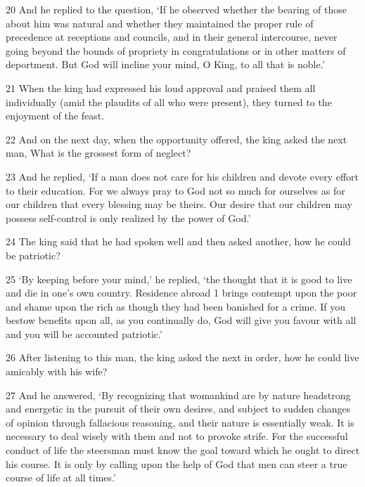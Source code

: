 \par 20 And he replied to the question, ‘If he observed whether the bearing of those about him was natural and whether they maintained the proper rule of precedence at receptions and councils, and in their general intercourse, never going beyond the bounds of propriety in congratulations or in other matters of deportment. But God will incline your mind, O King, to all that is noble.’

\par 21 When the king had expressed his loud approval and praised them all individually (amid the plaudits of all who were present), they turned to the enjoyment of the feast.

\par 22 And on the next day, when the opportunity offered, the king asked the next man, What is the grossest form of neglect?

\par 23 And he replied, ‘If a man does not care for his children and devote every effort to their education. For we always pray to God not so much for ourselves as for our children that every blessing may be theirs. Our desire that our children may possess self-control is only realized by the power of God.’

\par 24 The king said that he had spoken well and then asked another, how he could be patriotic?

\par 25 ‘By keeping before your mind,’ he replied, ‘the thought that it is good to live and die in one's own country. Residence abroad 1 brings contempt upon the poor and shame upon the rich as though they had been banished for a crime. If you bestow benefits upon all, as you continually do, God will give you favour with all and you will be accounted patriotic.’

\par 26 After listening to this man, the king asked the next in order, how he could live amicably with his wife?

\par 27 And he answered, ‘By recognizing that womankind are by nature headstrong and energetic in the pursuit of their own desires, and subject to sudden changes of opinion through fallacious reasoning, and their nature is essentially weak. It is necessary to deal wisely with them and not to provoke strife. For the successful conduct of life the steersman must know the goal toward which he ought to direct his course. It is only by calling upon the help of God that men can steer a true course of life at all times.’

